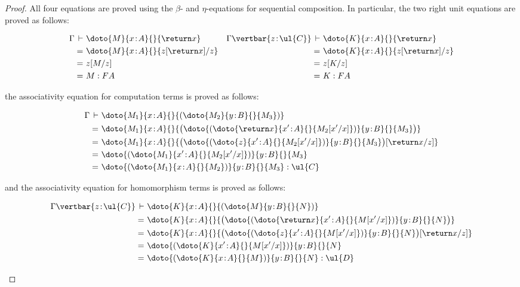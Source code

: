 \begin{proof}
All four equations are proved using the $\beta$- and $\eta$-equations for sequential composition.
In particular, the two right unit equations are proved as follows:
\begin{fleqn}[0.3cm]
\begin{align*}
\Gamma \,\vdash\,\, & \doto {M} {x \!:\! A} {} {\return x}
&
\Gamma \vertbar {z \!:\! \ul{C}} \,\vdash\,\, & \doto {K} {x \!:\! A} {} {\return x}
\\
=\,\, & \doto {M} {x \!:\! A} {} {z[\return x]/z}
&
=\,\, & \doto {K} {x \!:\! A} {} {z[\return x]/z}
\\
=\,\, & z[M/z]
&
=\,\, & z[K/z]
\\
=\,\, & M : FA
&
=\,\, & K : FA
\end{align*}
\end{fleqn}
the associativity equation for computation terms is proved as follows:
\begin{fleqn}[0.3cm]
\begin{align*}
\Gamma \,\vdash\,\, & \doto {M_1} {x \!:\! A} {} {(\doto {M_2} {y \!:\! B} {} {M_3})}
\\
=\,\, & \doto {M_1} {x \!:\! A} {} {\big(\doto {(\doto {\return x} {x' \!:\! A} {} {M_2[x'/x]})} {y \!:\! B} {} {M_3}\big)}
\\
=\,\, & \doto {M_1} {x \!:\! A} {} {\big(\doto {(\doto {z} {x' \!:\! A} {} {M_2[x'/x]})} {y \!:\! B} {} {M_3}\big)[\return x/z]}
\\
=\,\, & \doto {(\doto {M_1} {x' \!:\! A} {} {M_2[x'/x]})} {y \!:\! B} {} {M_3}
\\
=\,\, & \doto {(\doto {M_1} {x \!:\! A} {} {M_2})} {y \!:\! B} {} {M_3} : \ul{C}
\end{align*}
\end{fleqn}
and the associativity equation for homomorphism terms is proved as follows:
\begin{fleqn}[0.3cm]
\begin{align*}
\Gamma \vertbar {z \!:\! \ul{C}} \,\vdash\,\, & \doto {K} {x \!:\! A} {} {(\doto {M} {y \!:\! B} {} {N})}
\\
=\,\, & \doto {K} {x \!:\! A} {} {\big(\doto {(\doto {\return x} {x' \!:\! A} {} {M[x'/x]})} {y \!:\! B} {} {N}\big)}
\\
=\,\, & \doto {K} {x \!:\! A} {} {\big(\doto {(\doto {z} {x' \!:\! A} {} {M[x'/x]})} {y \!:\! B} {} {N}\big)[\return x/z]}
\\
=\,\, & \doto {(\doto {K} {x' \!:\! A} {} {M[x'/x]})} {y \!:\! B} {} {N}
\\
=\,\, & \doto {(\doto {K} {x \!:\! A} {} {M})} {y \!:\! B} {} {N} : \ul{D}
\end{align*}
\end{fleqn}
\end{proof}

